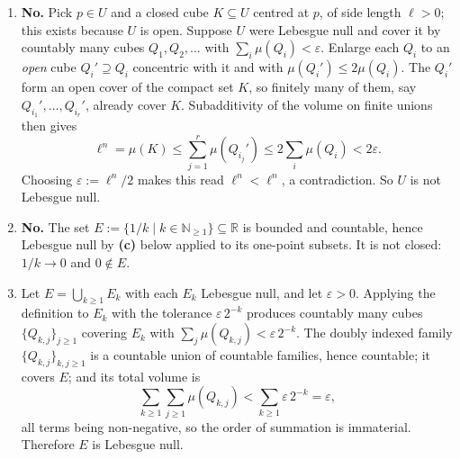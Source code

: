 \begin{exercisesolution}
\label{sol:lebesgue_null_sets_properties}
\begin{enumerate}[label=\textbf{(\alph*)}]
  \item \textbf{No.} Pick $p \in U$ and a closed cube $K \subseteq U$ centred at $p$, of side
    length $\ell > 0$; this exists because $U$ is open. Suppose $U$ were Lebesgue null and cover it
    by countably many cubes $Q_1,Q_2,\dots$ with $\sum_i \mu(Q_i) < \varepsilon$. Enlarge each
    $Q_i$ to an \emph{open} cube $Q_i'\supseteq Q_i$ concentric with it and with
    $\mu(Q_i') \le 2\mu(Q_i)$. The $Q_i'$ form an open cover of the compact set $K$, so finitely
    many of them, say $Q_{i_1}',\dots,Q_{i_r}'$, already cover $K$. Subadditivity of the volume on
    finite unions then gives
\[\ell^n = \mu(K) \le \sum_{j=1}^r \mu(Q_{i_j}') \le 2\sum_{i} \mu(Q_i) < 2\varepsilon.\]
    Choosing $\varepsilon := \ell^n/2$ makes this read $\ell^n < \ell^n$, a contradiction. So $U$
    is not Lebesgue null.

  \item \textbf{No.} The set $E := \{1/k \mid k \in \mathbb{N}_{\ge1}\} \subseteq \mathbb{R}$ is
    bounded and countable, hence Lebesgue null by \textbf{(c)} below applied to its one-point
    subsets. It is not closed: $1/k \to 0$ and $0 \notin E$.

  \item Let $E = \bigcup_{k\ge1} E_k$ with each $E_k$ Lebesgue null, and let $\varepsilon > 0$.
    Applying the definition to $E_k$ with the tolerance $\varepsilon\,2^{-k}$ produces countably
    many cubes $\{Q_{k,j}\}_{j\ge1}$ covering $E_k$ with
    $\sum_{j}\mu(Q_{k,j}) < \varepsilon\,2^{-k}$. The doubly indexed family
    $\{Q_{k,j}\}_{k,j\ge1}$ is a countable union of countable families, hence countable; it covers
    $E$; and its total volume is
\[\sum_{k\ge1}\sum_{j\ge1}\mu(Q_{k,j}) < \sum_{k\ge1}\varepsilon\,2^{-k} = \varepsilon,\]
    all terms being non-negative, so the order of summation is immaterial. Therefore $E$ is
    Lebesgue null.


\end{enumerate}
\end{exercisesolution}

